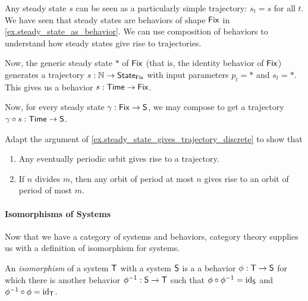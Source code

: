 \documentclass[DynamicalBook]{subfiles}
\begin{document}
\begin{example}\label{ex.steady_state_gives_trajectory_discrete}
  Any steady state $s$ can be seen as a particularly simple trajectory: $s_t =
  s$ for all $t$. We have seen
  that steady states are behaviors of shape $\mathsf{Fix}$ in
  \cref{ex.steady_state_as_behavior}. We can use composition of behaviors to
  understand how steady states give rise to trajectories.

  Now, the generic steady state $\ast$ of $\mathsf{Fix}$ (that is, the identity behavior of
  $\mathsf{Fix}$) generates a trajectory $s : \mathbb{N} \to \mathsf{State}_{\mathsf{Fix}}$ with input
  parameters $p_t = \ast$ and $s_t = \ast$. This gives us a behavior $s :
  \mathsf{Time} \to \mathsf{Fix}$.
  
  Now, for every steady state $\gamma : \mathsf{Fix} \to \mathsf{S}$, we may compose
  to get a trajectory $\gamma \circ s : \mathsf{Time} \to \mathsf{S}$.
\end{example}

\begin{exercise}\label{ex.behaviors_as_change_of_kind_discrete}
Adapt the argument of \cref{ex.steady_state_gives_trajectory_discrete} to show
that
\begin{enumerate}
  \item Any eventually periodic orbit gives rise to a trajectory.
  \item If $n$ divides $m$, then any orbit of period at most $n$ gives rise to
    an orbit of period of most $m$.
\end{enumerate}
\end{exercise}

\paragraph{Isomorphisms of Systems}

Now that we have a category of systems and behaviors, category theory supplies
us with a definition of isomorphism for systems. 
\begin{definition}\label{def.isomorphism_of_systems_discrete}
  An \emph{isomorphism} of a system $\mathsf{T}$ with a system $\mathsf{S}$ is a
  a behavior $\phi : \mathsf{T} \to \mathsf{S}$ for which there is another behavior
  $\phi^{-1} : \mathsf{S} \to \mathsf{T}$ such that $\phi \circ \phi ^{-1} =
  \mathrm{id}_{\mathsf{S}}$ and $\phi ^{-1} \circ \phi = \mathrm{id}_{\mathsf{T}}$.
\end{definition}
\end{document}
